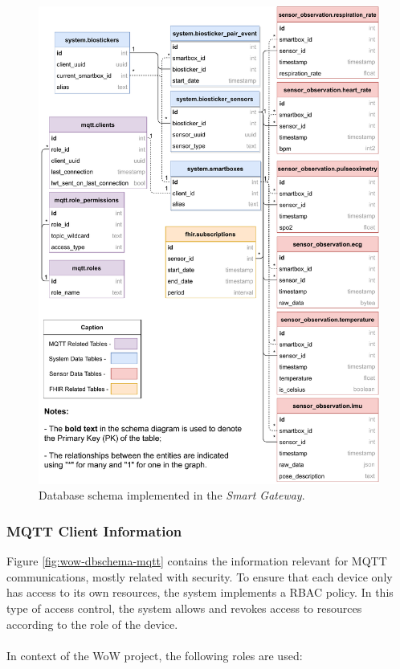 \begin{figure}[H]
    \centering
    \includegraphics[width=0.86\linewidth]{images/database-schema-general.pdf}
    \caption[Database schema implemented in the \textit{Smart Gateway}.]{Database schema implemented in the \textit{Smart Gateway}.}
    \label{fig:wow-dbschema-full}
\end{figure}

\subsubsection{MQTT Client Information}

Figure \ref{fig:wow-dbschema-mqtt} contains the information relevant for \acs{MQTT} communications, mostly related with security. To ensure that each device only has access to its own resources, the system implements a \acf{RBAC} policy. 
In this type of access control, the system allows and revokes access to resources according to the role of the device. 

\paragraph{} In context of the \acs{WoW} project, the following roles are used:

